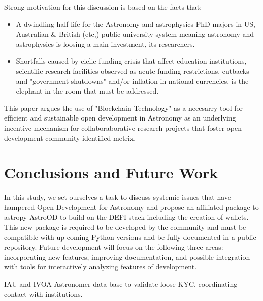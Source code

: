 \documentclass[final,5p,times,twocolumn,authoryear]{elsarticle}
\begin{document}
   Strong motivation for this discussion is based on the facts that:
   
\begin{itemize}
       \item A dwindling half-life for the Astronomy and astrophysics PhD majors in US, Australian \& British (etc,) public university system meaning astronomy and astrophysics is loosing a main investment, its researchers.  
       
       \item Shortfalls caused by ciclic funding crisis that affect education institutions, scientific research facilities observed as acute funding restrictions, cutbacks and "government shutdowns" and/or inflation in national currencies, is the elephant in the room that must be addressed.
\end{itemize}
       
       
This paper argues the use of "Blockchain Technology" as a necesarry tool for efficient and sustainable open development in Astronomy as an underlying incentive mechanism for collaboraborative research projects that foster open development community identified metrix.  


\section{Conclusions and Future Work}
\label{sec:5}
%
In this study, we set ourselves a task to discuss systemic issues that have hampered Open Development for Astronomy and propose an affiliated package to astropy AstroOD to build on the DEFI stack including the creation of wallets. This new package is required to be developed by the community and must be compatible with up-coming Python versions and be fully documented in a public repository. 
%
Future development will focus on the following three areas: incorporating
new features, improving documentation, and 
possible integration with tools for interactively analyzing features of development.

IAU and IVOA Astronomer data-base to validate loose KYC, coordinating contact with institutions. 

\end{document}
